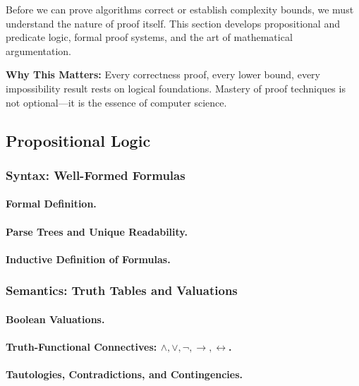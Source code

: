 \begin{sectionintro}
Before we can prove algorithms correct or establish complexity bounds, we must 
understand the nature of proof itself. This section develops propositional and 
predicate logic, formal proof systems, and the art of mathematical argumentation.

\textbf{Why This Matters:} Every correctness proof, every lower bound, every 
impossibility result rests on logical foundations. Mastery of proof techniques 
is not optional—it is the essence of computer science.
\end{sectionintro}

\subsection{Propositional Logic}
\label{subsec:propositional-logic}

\subsubsection{Syntax: Well-Formed Formulas}
\paragraph{Formal Definition.}
\paragraph{Parse Trees and Unique Readability.}
\paragraph{Inductive Definition of Formulas.}

\subsubsection{Semantics: Truth Tables and Valuations}
\paragraph{Boolean Valuations.}
\paragraph{Truth-Functional Connectives: $\land, \lor, \neg, \rightarrow, \leftrightarrow$.}
\paragraph{Tautologies, Contradictions, and Contingencies.}

